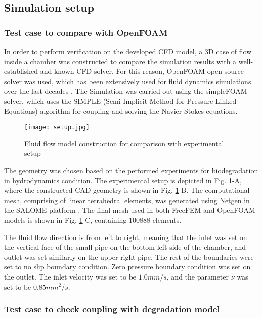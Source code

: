 \subsection{Simulation setup}

\subsubsection{Test case to compare with OpenFOAM}

In order to perform verification on the developed CFD model, a 3D case of flow inside a chamber was constructed to compare the simulation results with a well-established and known CFD solver. For this reason, OpenFOAM open-source solver was used, which has been extensively used for fluid dynamics simulations over the last decades \cite{Weller1998}. The Simulation was carried out using the simpleFOAM solver, which uses the SIMPLE (Semi-Implicit Method for Pressure Linked Equations) algorithm for coupling and solving the Navier-Stokes equations.

\begin{figure}[h]
\centering
\medskip
\texttt{[image: setup.jpg]}
\caption[Fluid flow model construction for comparison with experimental setup]{Fluid flow model construction for comparison with experimental setup} \label{fig:fluid_setup}
\end{figure}

The geometry was chosen based on the performed experiments for biodegradation in hydrodynamics condition. The experimental setup is depicted in Fig. \ref{fig:fluid_setup}-A, where the constructed CAD geometry is shown in Fig. \ref{fig:fluid_setup}-B. The computational mesh, comprising of linear tetrahedral elements, was generated using Netgen \cite{Schoeberl1997} in the SALOME platform \cite{Ribes2007}. The final mesh used in both FreeFEM and OpenFOAM models is shown in Fig. \ref{fig:fluid_setup}-C, containing \num{100888} elements.

The fluid flow direction is from left to right, meaning that the inlet was set on the vertical face of the small pipe on the bottom left side of the chamber, and outlet was set similarly on the upper right pipe. The rest of the boundaries were set to no slip boundary condition. Zero pressure boundary condition was set on the outlet. The inlet velocity was set to be $1.0 mm/s$, and the parameter $\nu$ was set to be $0.85 mm^2/s$.

\subsubsection{Test case to check coupling with degradation model}


